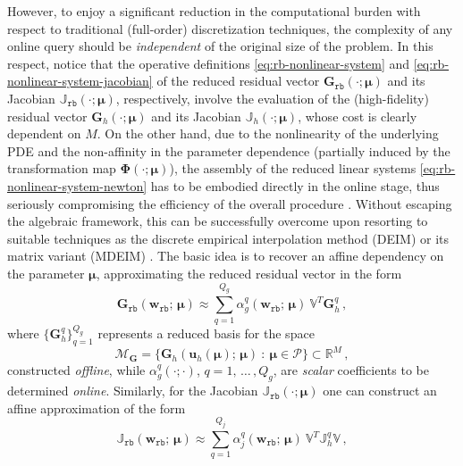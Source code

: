 \documentclass[12pt, a4paper, twoside, openright]{report}
\numberwithin{equation}{chapter}
\theoremstyle{theorem}
\theoremstyle{definition}
\theoremstyle{remark}
\theoremstyle{proposition}
\numberwithin{figure}{chapter}
\newcommand{\bg}[1]{\boldsymbol{#1}}
\begin{document}
		However, to enjoy a significant reduction in the computational burden with respect to traditional (full-order) discretization techniques, the complexity of any online query should be \emph{independent} of the original size of the problem. In this respect, notice that the operative definitions \eqref{eq:rb-nonlinear-system} and \eqref{eq:rb-nonlinear-system-jacobian} of the reduced residual vector $\mathbf{G}_{\texttt{rb}}(\cdot; \bg{\mu})$ and its Jacobian $\mathbb{J}_{\texttt{rb}}(\cdot; \bg{\mu})$, respectively, involve the evaluation of the (high-fidelity) residual vector $\mathbf{G}_h(\cdot; \bg{\mu})$ and its Jacobian $\mathbb{J}_h(\cdot; \bg{\mu})$, whose cost is clearly dependent on $M$. On the other hand, due to the nonlinearity of the underlying PDE and the non-affinity in the parameter dependence (partially induced by the transformation map $\bg{\Phi}(\cdot; \bg{\mu})$), the assembly of the reduced linear systems \eqref{eq:rb-nonlinear-system-newton} has to be embodied directly in the online stage, thus seriously compromising the efficiency of the overall procedure \cite{Bar04}. Without escaping the algebraic framework, this can be successfully overcome upon resorting to suitable techniques as the discrete empirical interpolation method (DEIM) or its matrix variant (MDEIM) \cite{MN16}. The basic idea is to recover an affine dependency on the parameter $\bg{\mu}$, approximating the reduced residual vector in the form
		\begin{equation*}
			\mathbf{G}_{\texttt{rb}}(\mathbf{w}_{\texttt{rb}}; \, \bg{\mu}) \approx \sum_{q = 1}^{Q_g} \alpha_g^q(\mathbf{w}_{\texttt{rb}}; \, \bg{\mu}) ~ \mathbb{V}^T \mathbf{G}_h^q \, , 
		\end{equation*}
		where $\big\lbrace \mathbf{G}_h^q \big\rbrace_{q = 1}^{Q_g}$ represents a reduced basis for the space
		\begin{equation*}
			\mathcal{M}_{\mathbf{G}} = \big\lbrace \mathbf{G}_h(\mathbf{u}_h(\bg{\mu}); \, \bg{\mu}) ~ : ~ \bg{\mu} \in \mathcal{P} \big\rbrace \subset \mathbb{R}^M \, ,
		\end{equation*}
		constructed \emph{offline}, while $\alpha_g^q(\cdot; \cdot)$, $q = 1, \, \ldots \, , Q_g$, are \emph{scalar} coefficients to be determined \emph{online}. Similarly, for the Jacobian $\mathbb{J}_{\texttt{rb}}(\cdot; \bg{\mu})$ one can construct an affine approximation of the form
		\begin{equation*}
			\mathbb{J}_{\texttt{rb}}(\mathbf{w}_{\texttt{rb}}; \, \bg{\mu}) \approx \sum_{q = 1}^{Q_j} \alpha_j^q(\mathbf{w}_{\texttt{rb}}; \, \bg{\mu}) ~ \mathbb{V}^T \mathbb{J}_h^q \mathbb{V} \, ,
		\end{equation*}
\end{document}
